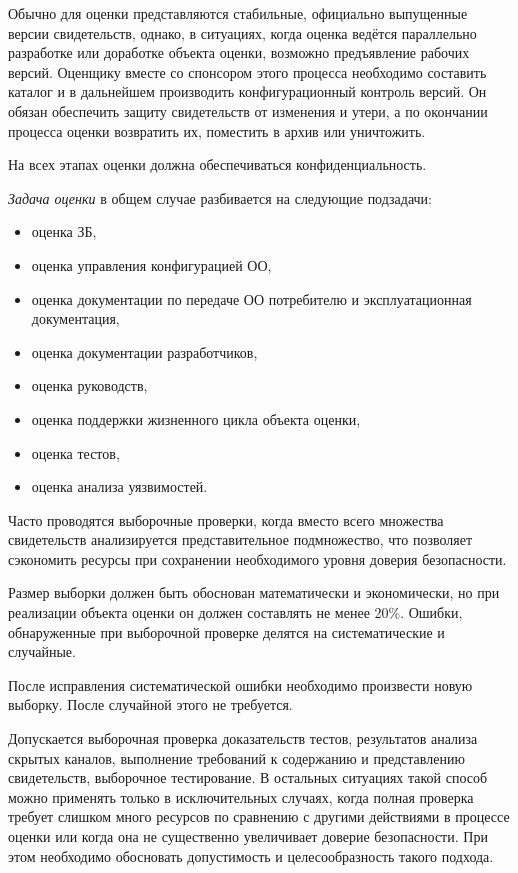 \documentclass[12pt, russian, oneside, article]{ncc}
\begin{document}
Обычно для оценки представляются стабильные, официально выпущенные версии свидетельств, однако, в ситуациях, когда оценка ведётся параллельно разработке или доработке объекта оценки, возможно предъявление рабочих версий. Оценщику вместе со спонсором этого процесса необходимо составить каталог и в дальнейшем производить конфигурационный контроль версий. Он обязан обеспечить защиту свидетельств от изменения и утери, а по окончании процесса оценки возвратить их, поместить в архив или уничтожить.

На всех этапах оценки должна обеспечиваться конфиденциальность.

\emph{Задача оценки} в общем случае разбивается на следующие подзадачи:
\begin{itemize}
\item оценка ЗБ,
\item оценка управления конфигурацией ОО,
\item оценка документации по передаче ОО потребителю и эксплуатационная документация,
\item оценка документации разработчиков,
\item оценка руководств,
\item оценка поддержки жизненного цикла объекта оценки,
\item оценка тестов,
\item оценка анализа уязвимостей.
\end{itemize}

Часто проводятся выборочные проверки, когда вместо всего множества свидетельств анализируется представительное подмножество, что позволяет сэкономить ресурсы при сохранении необходимого уровня доверия безопасности.

Размер выборки должен быть обоснован математически и экономически, но при реализации объекта оценки он должен составлять не менее 20\%. Ошибки, обнаруженные при выборочной проверке делятся на систематические и случайные.

После исправления систематической ошибки необходимо произвести новую выборку. После случайной этого не требуется.

Допускается выборочная проверка доказательств тестов, результатов анализа скрытых каналов, выполнение требований к содержанию и представлению свидетельств, выборочное тестирование. В остальных ситуациях такой способ можно применять только в исключительных случаях, когда полная проверка требует слишком много ресурсов по сравнению с другими действиями в процессе оценки или когда она не существенно увеличивает доверие безопасности. При этом необходимо обосновать допустимость и целесообразность такого подхода.
\end{document}

